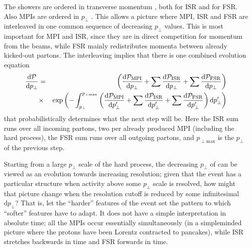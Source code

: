 The \pythiaeight showers are ordered in transverse momentum 
\cite{Sjostrand:2004ef}, both for ISR and for FSR. Also MPIs are ordered 
in $p_{\perp}$ \cite{Sjostrand:1987su}.
This allows a picture where MPI, ISR and FSR are interleaved in one 
common sequence of decreasing $p_{\perp}$ values. 
This is most important for MPI and ISR, since they are in direct 
competition for momentum from the beams, while FSR mainly 
redistributes momenta between already kicked-out partons.
The interleaving implies that there is one combined evolution equation
\begin{eqnarray}
\frac{\mathrm{d} \mathcal{P}}{\mathrm{d} p_{\perp}}&=& 
\left( \frac{\vphantom{\left(\right)} \mathrm{d}\mathcal{P}_{\mathrm{MPI}}}%
{\mathrm{d} p_{\perp}}  + 
\sum   \frac{\vphantom{\left(\right)} \mathrm{d}\mathcal{P}_{\mathrm{ISR}}}%
{\mathrm{d} p_{\perp}}  +
\sum   \frac{\vphantom{\left(\right)} \mathrm{d}\mathcal{P}_{\mathrm{FSR}}}%
{\mathrm{d} p_{\perp}} \right)
\nonumber \\ 
 & \times & \exp \left( - \int_{p_{\perp}}^{p_{\perp\mathrm{max}}} 
\left( \frac{\vphantom{\left(\right)} \mathrm{d}\mathcal{P}_{\mathrm{MPI}}}%
{\mathrm{d} p_{\perp}'}  + 
\sum   \frac{\vphantom{\left(\right)} \mathrm{d}\mathcal{P}_{\mathrm{ISR}}}%
{\mathrm{d} p_{\perp}'}  +
\sum   \frac{\vphantom{\left(\right)} \mathrm{d}\mathcal{P}_{\mathrm{FSR}}}%
{\mathrm{d} p_{\perp}'} 
\right) \mathrm{d} p_{\perp}' \right) 
\label{eq:pythiacombinedevol}
\end{eqnarray}
that probabilistically determines what the next step will be.
Here the ISR sum runs over all incoming partons, two per
already produced MPI (including the hard process), the FSR sum runs over 
all outgoing partons, and $p_{\perp\mathrm{max}}$ is the $p_{\perp}$ of the 
previous step.

Starting from a large $p_{\perp}$ scale of the hard process, the 
decreasing $p_{\perp}$ of  can be viewed 
as an evolution towards
increasing resolution; given that the event has a particular structure
when activity above some $p_{\perp}$ scale is resolved, how might that 
picture change when the resolution cutoff is reduced by some infinitesimal
$\mathrm{d} p_{\perp}$? That is, let the ``harder'' features of the event 
set the pattern to which ``softer'' features have to adapt.
It does not have a simple interpretation in absolute time;
all the MPIs occur essentially simultaneously (in a simpleminded
picture where the protons have been Lorentz contracted to pancakes),
while ISR stretches backwards in time and FSR forwards in time. 

